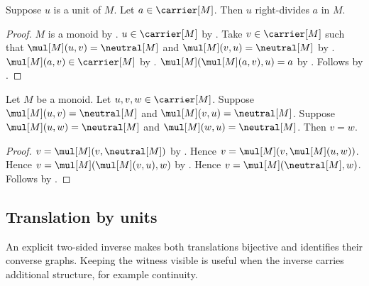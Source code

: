 \begin{theorem}\label{monoid_unit_right_divides}
    Suppose $u$ is a unit of $M$.
    Let $a\in\carrier[M]$.
    Then $u$ right-divides $a$ in $M$.
\end{theorem}
\begin{proof}
    $M$ is a monoid by .
    $u\in\carrier[M]$ by .
    Take $v\in\carrier[M]$ such that
        $\mul[M](u,v)=\neutral[M]$ and
        $\mul[M](v,u)=\neutral[M]$ by
        .
    $\mul[M](a,v)\in\carrier[M]$ by
        .
    $\mul[M](\mul[M](a,v),u)=a$ by
        .
    Follows by .
\end{proof}

\begin{theorem}\label{monoid_unit_inverse_unique}
    Let $M$ be a monoid.
    Let $u,v,w\in\carrier[M]$.
    Suppose $\mul[M](u,v)=\neutral[M]$ and
        $\mul[M](v,u)=\neutral[M]$.
    Suppose $\mul[M](u,w)=\neutral[M]$ and
        $\mul[M](w,u)=\neutral[M]$.
    Then $v=w$.
\end{theorem}
\begin{proof}
    $v=\mul[M](v,\neutral[M])$ by
        .
    Hence $v=\mul[M](v,\mul[M](u,w))$.
    Hence $v=\mul[M](\mul[M](v,u),w)$ by
        .
    Hence $v=\mul[M](\neutral[M],w)$.
    Follows by
        .
\end{proof}

\subsection{Translation by units}

An explicit two-sided inverse makes both translations bijective and identifies
their converse graphs.  Keeping the witness visible is useful when the
inverse carries additional structure, for example continuity.


